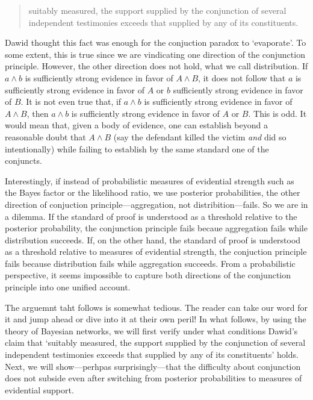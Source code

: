 \documentclass[10pt,dvipsnames,enabledeprecatedfontcommands]{scrartcl}
\begin{document}
\begin{quote} suitably measured, the support  supplied by the conjunction of several independent testimonies exceeds that supplied by any of its constituents.
 \end{quote}

\noindent Dawid thought this fact was enough for the conjuction paradox
to `evaporate'. To some extent, this is true since we are vindicating
one direction of the conjunction principle. However, the other direction
does not hold, what we call distribution. If \(a \wedge b\) is
sufficiently strong evidence in favor of \(A \wedge B\), it does not
follow that \(a\) is sufficiently strong evidence in favor of \(A\) or
\(b\) sufficiently strong evidence in favor of \(B\). It is not even
true that, if \(a \wedge b\) is sufficiently strong evidence in favor of
\(A \wedge B\), then \(a\wedge b\) is sufficiently strong evidence in
favor of \(A\) or \(B\). This is odd. It would mean that, given a body
of evidence, one can establish beyond a reasonable doubt that
\(A \wedge B\) (say the defendant killed the victim \textit{and} did so
intentionally) while failing to establish by the same standard one of
the conjuncts.

Interestingly, if instead of probabilistic measures of evidential
strength such as the Bayes factor or the likelihood ratio, we use
posterior probabilities, the other direction of conjuction
principle---aggregation, not distribition---fails. So we are in a
dilemma. If the standard of proof is understood as a threshold relative
to the posterior probability, the conjunction principle fails becaue
aggregation fails while distribution succeeds. If, on the other hand,
the standard of proof is understood as a threshold relative to measures
of evidential strength, the conjuction principle fails because
distribution fails while aggregation succeeds. From a probabilistic
perspective, it seems impossible to capture both directions of the
conjunction principle into one unified account.

The arguemnt taht follows is somewhat tedious. The reader can take our
word for it and jump ahead or dive into it at their own peril! In what
follows, by using the theory of Bayesian networks, we will first verify
under what conditions Dawid's claim that `suitably measured, the support
supplied by the conjunction of several independent testimonies exceeds
that supplied by any of its constituents' holds. Next, we will
show---perhpas surprisingly---that the difficulty about conjunction does
not subside even after switching from posterior probabilities to
measures of evidential support.
\end{document}
